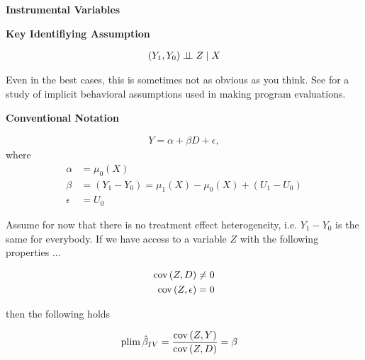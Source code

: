 \begin{frame}\begin{center}
\LARGE\textbf{Instrumental Variables}
\end{center}\end{frame}
\begin{frame}\textbf{Key Identifiying Assumption}

\begin{align*}
(Y_1, Y_0)\indep Z\mid X\\
\end{align*}

Even in the best cases, this is sometimes not as obvious as you think. See  for a study of implicit behavioral assumptions used in making program evaluations.
\end{frame}
\begin{frame}\textbf{Conventional Notation}

\begin{align*}
Y = \alpha + \beta D + \epsilon,
\end{align*}
where
\begin{align*}
\alpha &= \mu_0(X)  \\
\beta  & = (Y_1 - Y_0) =\mu_1(X) - \mu_0(X)  + (U_1 - U_0)\\
\epsilon & =U_0
\end{align*}
\end{frame}
\begin{frame}

Assume for now that there is no treatment effect heterogeneity, i.e. $Y_1 - Y_0$ is the same for everybody. If we have access to a variable $Z$ with the following properties ...

\begin{align*}
\mathrm{cov}\thinspace(Z, D) & \neq 0 \\
\mathrm{cov}\thinspace(Z, \epsilon) & = 0
\end{align*}

then the following holds

\begin{align*}
\mathrm{plim}\thinspace \hat{\beta}_{IV} & = \frac{\mathrm{cov}\thinspace(Z, Y)}{\mathrm{cov}\thinspace(Z, D)} = \beta
\end{align*}
\end{frame}
